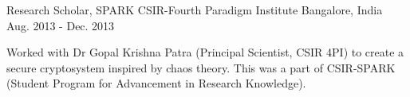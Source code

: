 \begin{cventries}
{\begin{cvitems}
      \end{cvitems}
    }
  \cventry
    {Research Scholar, SPARK} %
    {CSIR-Fourth Paradigm Institute} %
    {Bangalore, India} %
    {Aug. 2013 - Dec. 2013} %
    {
      \begin{cvitems}
        \item {Worked with Dr Gopal Krishna Patra (Principal Scientist, CSIR 4PI) to create a secure cryptosystem inspired by chaos theory. This was a part of CSIR-SPARK (Student Program for Advancement in Research Knowledge).}
      \end{cvitems}
    }
\end{cventries}
